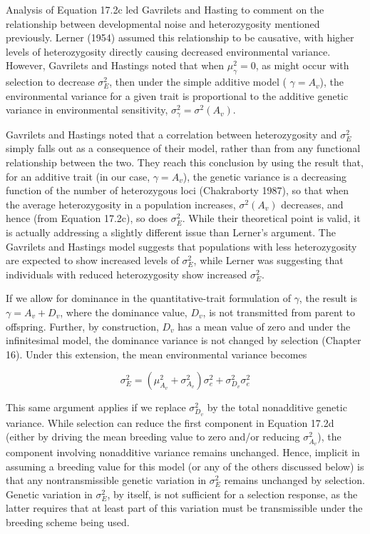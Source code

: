 \documentclass{article}
\begin{document}
Analysis of Equation 17.2c led Gavrilets and Hasting to comment on the relationship between developmental noise and heterozygosity mentioned previously. Lerner (1954) assumed this relationship to be causative, with higher levels of heterozygosity directly causing decreased environmental variance. However, Gavrilets and Hastings noted that when  $ \mu_{\gamma}^{2} = 0 $, as might occur with selection to decrease  $ \sigma_{E}^{2} $, then under the simple additive model ( $ \gamma = A_{v} $), the environmental variance for a given trait is proportional to the additive genetic variance in environmental sensitivity,  $ \sigma_{\gamma}^{2} = \sigma^{2}(A_{v}) $.

Gavrilets and Hastings noted that a correlation between heterozygosity and  $ \sigma_E^2 $ simply falls out as a consequence of their model, rather than from any functional relationship between the two. They reach this conclusion by using the result that, for an additive trait (in our case,  $ \gamma = A_v $), the genetic variance is a decreasing function of the number of heterozygous loci (Chakraborty 1987), so that when the average heterozygosity in a population increases,  $ \sigma^2(A_v) $ decreases, and hence (from Equation 17.2c), so does  $ \sigma_E^2 $. While their theoretical point is valid, it is actually addressing a slightly different issue than Lerner's argument. The Gavrilets and Hastings model suggests that populations with less heterozygosity are expected to show increased levels of  $ \sigma_E^2 $, while Lerner was suggesting that individuals with reduced heterozygosity show increased  $ \sigma_E^2 $.

If we allow for dominance in the quantitative-trait formulation of  $ \gamma $, the result is  $ \gamma = A_v + D_v $, where the dominance value,  $ D_v $, is not transmitted from parent to offspring. Further, by construction,  $ D_v $ has a mean value of zero and under the infinitesimal model, the dominance variance is not changed by selection (Chapter 16). Under this extension, the mean environmental variance becomes

\begin{equation}
\sigma_{E}^{2}=\left(\mu_{A_{v}}^{2}+\sigma_{A_{v}}^{2}\right)\sigma_{e}^{2}+\sigma_{D_{v}}^{2}\sigma_{e}^{2}
\tag{17.2d}
\label{eq:17_2d}
\end{equation}

This same argument applies if we replace  $ \sigma_{D_v}^2 $ by the total nonadditive genetic variance. While selection can reduce the first component in Equation 17.2d (either by driving the mean breeding value to zero and/or reducing  $ \sigma_{A_v}^2 $), the component involving nonadditive variance remains unchanged. Hence, implicit in assuming a breeding value for this model (or any of the others discussed below) is that any nontransmissible genetic variation in  $ \sigma_E^2 $ remains unchanged by selection. Genetic variation in  $ \sigma_E^2 $, by itself, is not sufficient for a selection response, as the latter requires that at least part of this variation must be transmissible under the breeding scheme being used.
\end{document}
